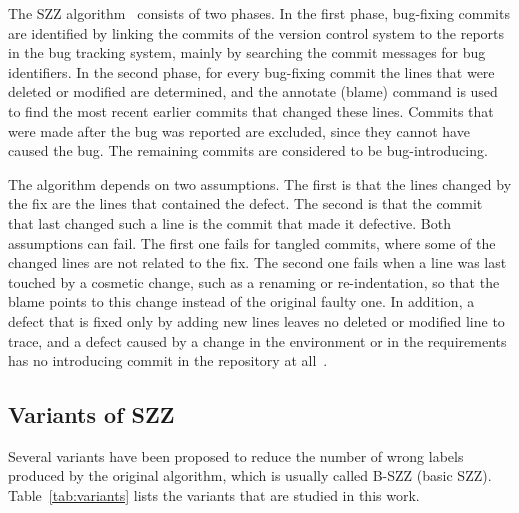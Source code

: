 \documentclass[12pt,a4paper,oneside]{report}
\begin{document}
The SZZ algorithm~\cite{sliwerski2005szz} consists of two phases. In the
first phase, bug-fixing commits are identified by linking the commits of the
version control system to the reports in the bug tracking system, mainly by
searching the commit messages for bug identifiers. In the second phase, for
every bug-fixing commit the lines that were deleted or modified are
determined, and the annotate (blame) command is used to find the most recent
earlier commits that changed these lines. Commits that were made after the bug
was reported are excluded, since they cannot have caused the bug. The
remaining commits are considered to be bug-introducing.

The algorithm depends on two assumptions. The first is that the lines changed
by the fix are the lines that contained the defect. The second is that the
commit that last changed such a line is the commit that made it defective.
Both assumptions can fail. The first one fails for tangled commits, where
some of the changed lines are not related to the fix. The second one fails
when a line was last touched by a cosmetic change, such as a renaming or
re-indentation, so that the blame points to this change instead of the
original faulty one. In addition, a defect that is fixed only by adding new
lines leaves no deleted or modified line to trace, and a defect caused by a
change in the environment or in the requirements has no introducing commit in
the repository at all~\cite{rodriguez2020bugs}.

\subsection{Variants of SZZ}

Several variants have been proposed to reduce the number of wrong labels
produced by the original algorithm, which is usually called B-SZZ (basic
SZZ). Table~\ref{tab:variants} lists the variants that are studied in this
work.
\end{document}
